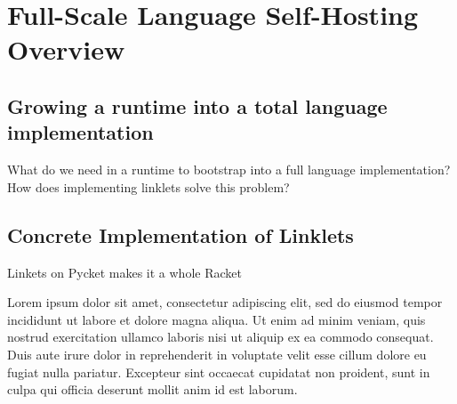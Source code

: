 \chapter{Full-Scale Language Self-Hosting Overview }

\section{Growing a runtime into a total language implementation}
What do we need in a runtime to bootstrap into a full language implementation?
How does implementing linklets solve this problem?

\section{Concrete Implementation of Linklets}

Linkets on Pycket makes it a whole Racket




	
Lorem ipsum dolor sit amet, consectetur adipiscing elit, sed do eiusmod tempor incididunt ut labore et dolore magna aliqua. Ut enim ad minim veniam, quis nostrud exercitation ullamco laboris nisi ut aliquip ex ea commodo consequat. Duis aute irure dolor in reprehenderit in voluptate velit esse cillum dolore eu fugiat nulla pariatur. Excepteur sint occaecat cupidatat non proident, sunt in culpa qui officia deserunt mollit anim id est laborum.

